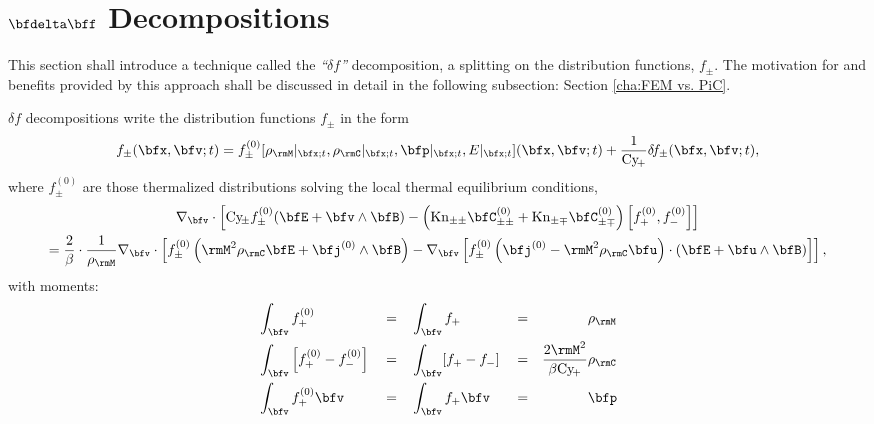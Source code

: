 \section{$\bfdelta\bff$ Decompositions}\label{cha:delta f decompositions}
    This section shall introduce a technique called the \emph{``$\delta\!f$''} decomposition, a splitting on the distribution functions, $f_{\pm}$. The motivation for and benefits provided by this approach shall be discussed in detail in the following subsection: Section \ref{cha:FEM vs. PiC}.

    \line

    \begin{definition}\label{def:delta f models}
        $\delta\!f$ decompositions write the distribution functions $f_{\pm}$ in the form
        \begin{equation}
            f_{\pm}(\bfx, \bfv; t)  =  f_{\pm}^{(0)}[\rho_{\rmM}|_{\bfx; t}, \rho_{\rmC}|_{\bfx; t}, \bfp|_{\bfx; t}, E|_{\bfx; t}](\bfx, \bfv; t) + \frac{1}{\rmCy\!_{+}}\delta\!f_{\pm}(\bfx, \bfv; t),
        \end{equation}
        where $f_{\pm}^{(0)}$ are those thermalized distributions solving the local thermal equilibrium conditions,
        \begin{multline}\label{eqn:thermal equilibrium identity}
            \nabla_{\bfv}\cdot\left[\rmCy\!_{\pm}f_{\pm}^{(0)}(\bfE + \bfv\wedge\bfB) - \left(\rmKn_{\pm\pm}\bfC_{\pm\pm}^{(0)} + \rmKn_{\pm\mp}\bfC_{\pm\mp}^{(0)}\right)\left[f_{+}^{(0)}, f_{-}^{(0)}\right]\right]  \\
            =  \frac{2}{\beta}\cdot\frac{1}{\rho_{\rmM}}\nabla_{\bfv}\cdot\left[f_{\pm}^{(0)}\left(\rmM^{2}\rho_{\rmC}\bfE + \bfj^{(0)}\wedge\bfB\right) - \nabla_{\bfv}\left[f_{\pm}^{(0)}\left(\bfj^{(0)} - \rmM^{2}\rho_{\rmC}\bfu\right)\cdot\left(\bfE + \bfu\wedge\bfB\right)\right]\right],
        \end{multline}
        with moments:
        \begin{align}
            &\int_{\bfv}f_{+}^{(0)}                             &  &=  &  &\int_{\bfv}f_{+}                         &  &=  &  &\rho_{\rmM}  \\
            &\int_{\bfv}\left[f_{+}^{(0)} - f_{-}^{(0)}\right]  &  &=  &  &\int_{\bfv}[f_{+} - f_{-}]               &  &=  &  \frac{2\rmM^{2}}{\beta\rmCy\!_{+}}&\rho_{\rmC}  \\
            &\int_{\bfv}f_{+}^{(0)}\bfv                         &  &=  &  &\int_{\bfv}f_{+}\bfv                     &  &=  &  &\bfp  \\

\end{align}
\end{definition}

